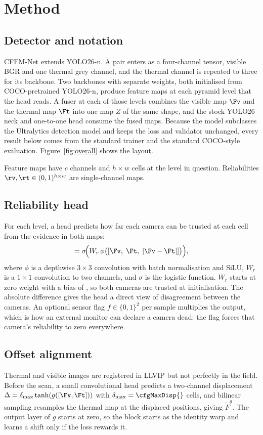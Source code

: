\section{Method}
\label{sec:method}
\subsection{Detector and notation}
CFFM-Net extends YOLO26-n. A pair enters as a four-channel tensor, visible BGR and one thermal grey channel, and the thermal channel is repeated to three for its backbone. Two backbones with separate weights, both initialised from COCO-pretrained YOLO26-n, produce feature maps at each pyramid level that the head reads. A fuser at each of those levels combines the visible map $\Fv$ and the thermal map $\Ft$ into one map $Z$ of the same shape, and the stock YOLO26 neck and one-to-one head consume the fused maps. Because the model subclasses the Ultralytics detection model and keeps the loss and validator unchanged, every result below comes from the standard trainer and the standard COCO-style evaluation. Figure~\ref{fig:overall} shows the layout.

Feature maps have $c$ channels and $h\times w$ cells at the level in question. Reliabilities $\rv,\rt\in(0,1)^{h\times w}$ are single-channel maps.

\subsection{Reliability head}
For each level, a head predicts how far each camera can be trusted at each cell from the evidence in both maps:
\begin{equation}
[\rv,\rt]=\sigma\!\Big(W_r\,\phi\big([\Fv,\;\Ft,\;|\Fv-\Ft|]\big)\Big),
\end{equation}
where $\phi$ is a depthwise $3{\times}3$ convolution with batch normalisation and SiLU, $W_r$ is a $1{\times}1$ convolution to two channels, and $\sigma$ is the logistic function. $W_r$ starts at zero weight with a bias of \cfgInitBias{}, so both cameras are trusted at initialisation. The absolute difference gives the head a direct view of disagreement between the cameras. An optional sensor flag $f\in\{0,1\}^2$ per sample multiplies the output, which is how an external monitor can declare a camera dead: the flag forces that camera's reliability to zero everywhere.

\subsection{Offset alignment}
Thermal and visible images are registered in LLVIP but not perfectly in the field. Before the scan, a small convolutional head predicts a two-channel displacement $\Delta=\delta_{\max}\tanh(g([\Fv,\Ft]))$ with $\delta_{\max}=\cfgMaxDisp{}$ cells, and bilinear sampling resamples the thermal map at the displaced positions, giving $\tilde F^{\theta}$. The output layer of $g$ starts at zero, so the block starts as the identity warp and learns a shift only if the loss rewards it.

